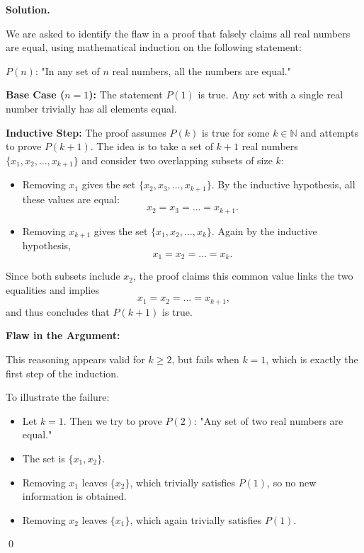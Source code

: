 \documentclass[12pt]{article}
\newenvironment{solution}{%
	\par\medskip
	\noindent\textbf{Solution.}\par\nopagebreak
}{%
	\hfill \qed \par\medskip
}
\begin{document}
	\begin{solution}
		We are asked to identify the flaw in a proof that falsely claims all real numbers are equal, using mathematical induction on the following statement:
		
		\begin{center}
			$P(n)$: "In any set of $n$ real numbers, all the numbers are equal."
		\end{center}
		
		\textbf{Base Case ($n = 1$):}  
		The statement $P(1)$ is true. Any set with a single real number trivially has all elements equal.
		
		\textbf{Inductive Step:}  
		The proof assumes $P(k)$ is true for some $k \in \mathbb{N}$ and attempts to prove $P(k+1)$. The idea is to take a set of $k+1$ real numbers $\{x_1, x_2, \dots, x_{k+1}\}$ and consider two overlapping subsets of size $k$:
		
		\begin{itemize}
			\item Removing $x_1$ gives the set $\{x_2, x_3, \dots, x_{k+1}\}$. By the inductive hypothesis, all these values are equal:  
			\[
			x_2 = x_3 = \dots = x_{k+1}.
			\]
			
			\item Removing $x_{k+1}$ gives the set $\{x_1, x_2, \dots, x_k\}$. Again by the inductive hypothesis,  
			\[
			x_1 = x_2 = \dots = x_k.
			\]
		\end{itemize}
		
		Since both subsets include $x_2$, the proof claims this common value links the two equalities and implies
		\[
		x_1 = x_2 = \dots = x_{k+1},
		\]
		and thus concludes that $P(k+1)$ is true.
		
		\textbf{Flaw in the Argument:}
		
		This reasoning appears valid for \( k \geq 2 \), but fails when \( k = 1 \), which is exactly the first step of the induction.
		
		To illustrate the failure:
		
		\begin{itemize}
			\item Let \( k = 1 \). Then we try to prove \( P(2) \): "Any set of two real numbers are equal."
			\item The set is \( \{x_1, x_2\} \).
			\item Removing \( x_1 \) leaves \( \{x_2\} \), which trivially satisfies \( P(1) \), so no new information is obtained.
			\item Removing \( x_2 \) leaves \( \{x_1\} \), which again trivially satisfies \( P(1) \).
		\end{itemize}
		

\end{solution}
\end{document}
